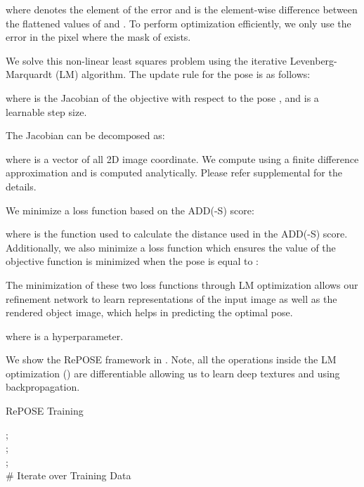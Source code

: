 \documentclass[10pt,twocolumn,letterpaper]{article}
\begin{document}
where  denotes the  element of the error  and is the element-wise difference between the flattened values of  and . To perform optimization efficiently, we only use the error  in the pixel where the mask of  exists.

We solve this non-linear least squares problem using the iterative Levenberg-Marquardt (LM) algorithm. The update rule for the pose  is as follows:

where  is the Jacobian of the objective with respect to the pose , and  is a learnable step size.

The Jacobian  can be decomposed as:

where  is a vector of all 2D image coordinate. We compute  using a finite difference approximation and  is computed analytically. Please refer supplemental for the details. 

We minimize a loss function  based on the ADD(-S) score:

where  is the function used to calculate the distance used in the ADD(-S) score.
Additionally, we also minimize a loss function  which ensures the value of the objective function is minimized when the pose  is equal to :


The minimization of these two loss functions through LM optimization allows our refinement network to learn representations of the input image as well as the rendered object image, which helps in predicting the optimal pose.

where  is a hyperparameter.

We show the RePOSE framework in .
Note, all the operations inside the LM optimization () are differentiable allowing us to learn deep textures  and  using backpropagation. 

\begin{algorithm}[t]
\SetAlCapNameFnt{\small}
\SetAlCapFnt{\small}
\small{
\caption{RePOSE Training}\label{alg:repose}
; \\
; \\
; \\
\# Iterate over Training Data \\
}
\end{algorithm}
\end{document}
